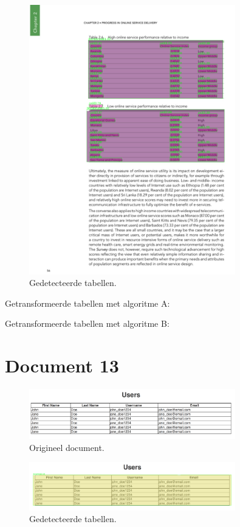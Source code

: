 \begin{figure}[H]
    \centering
    \includegraphics[width=0.8\textwidth]{test-resultaten/12/detected_tables.png}
    \caption{Gedetecteerde tabellen.}
\end{figure}

Getransformeerde tabellen met algoritme A:

Getransformeerde tabellen met algoritme B:
\section{Document 13}

\begin{figure}[H]
    \centering
    \includegraphics[width=0.8\textwidth]{test-resultaten/13/original.png}
    \caption{Origineel document.}
\end{figure}

\begin{figure}[H]
    \centering
    \includegraphics[width=0.8\textwidth]{test-resultaten/13/detected_tables.png}
    \caption{Gedetecteerde tabellen.}
\end{figure}

